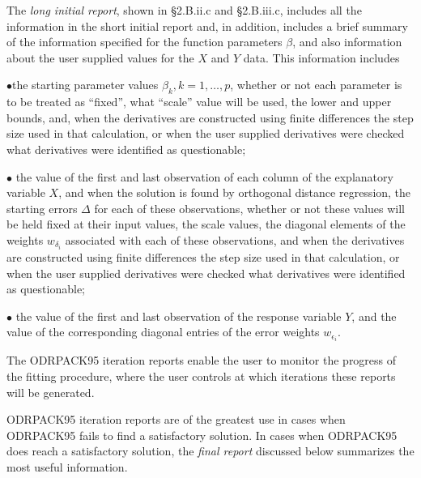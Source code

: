 \noindent The {\it long initial report}, shown in \S 2.B.ii.c and \S 2.B.iii.c, includes all the information in the short initial report and, in addition, includes a brief summary of the information specified for the function parameters $\beta$, and also information about the user supplied values for the $X$ and $Y$ data. This information includes
\item{$\bullet$}the starting parameter values $\beta_{k},k=1,\ldots,p$,
whether or not each parameter is to be treated as ``fixed'', what
``scale'' value will be used, the lower and upper bounds, and, when the
derivatives are constructed using finite differences the step size used
in that calculation, or when the user supplied derivatives were checked
what derivatives were identified as questionable;
\item{$\bullet$} the value of the first and last observation of each column of the explanatory variable $X$, and when the solution is found by orthogonal distance regression, 
\itemitem{$\circ$} the starting errors $\Delta$ for each of these observations,
\itemitem{$\circ$} whether or not these values will be held fixed at their input values,
\itemitem{$\circ$} the scale values,
\itemitem{$\circ$} the diagonal elements of the weights $w_{\delta_{i}}$ associated with each of these observations, and
\itemitem{$\circ$} when the derivatives are constructed using finite differences the step size used in that calculation, or when the user supplied derivatives were checked what derivatives were identified as questionable;
\item{$\bullet$} the value of the first and last observation of the response variable $Y$, and the value of the corresponding diagonal entries of the error weights $w_{\epsilon_{i}}$.

\medskip\noindent The ODRPACK95 iteration reports enable the user to monitor the progress of the fitting procedure, where the user controls at which iterations these reports will be generated.

\noindent ODRPACK95 iteration reports are of the greatest use in cases when
ODRPACK95 fails to find a satisfactory solution. In cases when ODRPACK95 does reach a satisfactory solution, the {\it final report} discussed below summarizes the most useful information.

